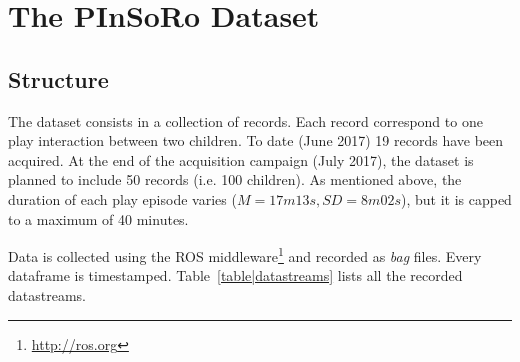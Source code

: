 \documentclass{article}
\newcommand{\ie}{i.e.\xspace}
\begin{document}
\section{The PInSoRo Dataset}

\subsection{Structure}

The dataset consists in a collection of records. Each record correspond to one
play interaction between two children. To date (June 2017) 19 records have been acquired. At the end of the acquisition campaign
(July 2017), the dataset is planned to include 50 records (\ie 100 children). As
mentioned above, the duration of each play episode varies ($M=17m13s,
SD=8m02s$), but it is capped to a maximum of 40 minutes.


Data is collected using the ROS middleware\footnote{\url{http://ros.org}} and
recorded as \emph{bag} files. Every dataframe is timestamped.
Table~\ref{table|datastreams} lists all the recorded datastreams.
\end{document}
